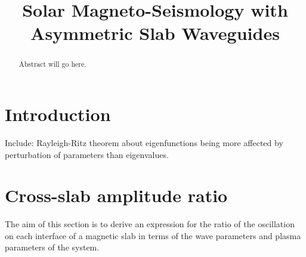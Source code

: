 \documentclass[namedreferences]{solarphysics}
\numberwithin{equation}{section}
\begin{document}
\begin{article}

\begin{opening}

\title{Solar Magneto-Seismology with Asymmetric Slab Waveguides}

\author[addressref={UoS},email={}]{}

\author[addressref={UoS},corref,email={robertus@sheffield.ac.uk}]{}

%

\address[id={UoS}]{Solar Physics and Space Plasma Research Centre, School of Mathematics and Statistics, University of Sheffield, Hicks Building, Hounsfield Road, Sheffield, S3 7RH, UK.}


\begin{abstract}
Abstract will go here.
\end{abstract}
\end{opening}

\section{Introduction}
Include: Rayleigh-Ritz theorem about eigenfunctions being more affected by perturbation of parameters than eigenvalues. 

\section{Cross-slab amplitude ratio}
The aim of this section is to derive an expression for the ratio of the oscillation on each interface of a magnetic slab in terms of the wave parameters and plasma parameters of the system.


\end{article}
\end{document}
